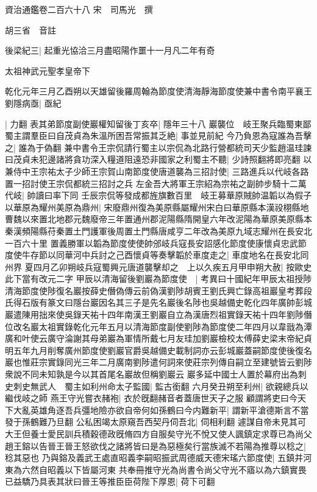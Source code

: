 資治通鑑卷二百六十八
宋　司馬光　撰

胡三省　音註

後梁紀三|{
	起重光協洽三月盡昭陽作噩十一月凡二年有奇}


太祖神武元聖孝皇帝下

乾化元年三月乙酉朔以天雄留後羅周翰為節度使清海靜海節度使兼中書令南平襄王劉隱病亟|{
	亟紀}


|{
	力翻}
表其弟節度副使巖權知留後丁亥卒|{
	隱年三十八}
巖襲位　岐王聚兵臨蜀東鄙蜀主謂羣臣曰自茂貞為朱溫所困吾常振其乏絶|{
	事並見前紀}
今乃負恩為寇誰為吾擊之|{
	誰為于偽翻}
兼中書令王宗侃請行蜀主以宗侃為北路行營都統司天少監趙温珪諫曰茂貞未犯邊諸將貪功深入糧道阻遠恐非國家之利蜀主不聽|{
	少詩照翻將即亮翻}
以兼侍中王宗祐太子少師王宗賀山南節度使唐道襲為三招討使|{
	三路進兵以代岐各路置一招討使王宗侃都統三招討之兵}
左金吾大將軍王宗紹為宗祐之副帥步騎十二萬代岐|{
	帥讀曰率下同}
壬辰宗侃等發成都旌旗數百里　岐王募華原賊帥温韜以為假子以華原為耀州美原為鼎州|{
	宋廢鼎州復為美原縣屬耀州宋白曰華原縣本漢祋栩縣地曹魏以來置北地郡元魏廢帝三年置通州郡泥陽縣隋開皇六年改泥陽為華原美原縣本秦漢頻陽縣苻秦置土門護軍後周置土門縣唐咸亨二年改為美原九域志耀州在長安北一百六十里}
置義勝軍以韜為節度使使帥邠岐兵寇長安詔感化節度使康懷貞忠武節度使牛存節以同華河中兵討之己酉懷貞等奏擊韜於車度走之|{
	車度地名在長安北同州界}
夏四月乙卯朔岐兵寇蜀興元唐道襲擊却之　上以久疾五月甲申朔大赦|{
	按歐史此下當有改元二字}
甲辰以清海留後劉巖為節度使　|{
	考異曰十國紀年甲辰太祖授陟清海節度使陟復名巖按薛史僭偽傳云前偽漢劉陟胡賓王劉氏興亡錄高祖巖皇考葬段氏得石版有篆文曰隱台巖因名其三子是先名巖後名陟也吳越備史乾化四年廣帥彭城巖遣陳用拙來使吳錄天祐十四年南漢王劉巖自立為漢唐烈祖實錄天祐十四年劉陟僭位改名巖太祖實錄乾化元年五月以清海節度副使劉陟為節度使二年四月以韋戩為潭廣和叶使云廣守淪謝其母弟巖為軍情所戴七月友珪加劉巖檢校太傅薛史梁末帝紀貞明五年九月削奪廣州節度使劉巖官爵吳越備史載制詞亦云彭城巖蓋嗣節度使後復名巖也惟莊宗實錄同光三年二月廣南劉陟遣何詞來使莊宗列傳自嗣立至建號皆云劉陟衆說不同未知孰是今以其首尾名巖故但稱劉巖云}
巖多延中國士人置於幕府出為刺史刺史無武人　蜀主如利州命太子監國|{
	監古銜翻}
六月癸丑朔至利州|{
	欲親總兵以繼伐岐之師}
燕王守光嘗衣赭袍|{
	衣於旣翻赭音者蓋唐世天子之服}
顧謂將吏曰今天下大亂英雄角逐吾兵彊地險亦欲自帝何如孫鶴曰今内難新平|{
	謂新平滄德斯言不當發于孫鶴難乃旦翻}
公私困竭太原窺吾西契丹伺吾北|{
	伺相利翻}
遽謀自帝未見其可大王但養士愛民訓兵積穀德政旣脩四方自服矣守光不悅又使人諷鎮定求尊已為尚父趙王鎔以告晉王晉王怒欲伐之諸將皆曰是為惡極矣行當族滅不若陽為推尊以稔之|{
	稔其惡也}
乃與鎔及義武王處直昭義李嗣昭振武周德威天德宋瑤六節度使|{
	五鎮并河東為六然自昭義以下皆屬河東}
共奉冊推守光為尚書令尚父守光不寤以為六鎮實畏已益驕乃具表其狀曰晉王等推臣臣荷陛下厚恩|{
	荷下可翻}
